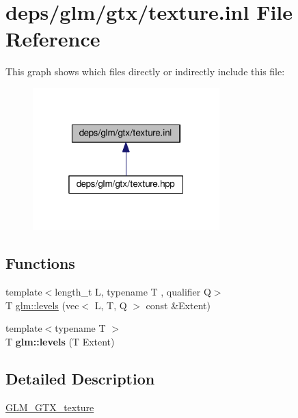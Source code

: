 \hypertarget{texture_8inl}{}\section{deps/glm/gtx/texture.inl File Reference}
\label{texture_8inl}
This graph shows which files directly or indirectly include this file\+:
\nopagebreak
\begin{figure}[H]
\begin{center}
\leavevmode
\includegraphics[width=205pt]{d5/da9/texture_8inl__dep__incl}
\end{center}
\end{figure}
\subsection*{Functions}
\begin{DoxyCompactItemize}
\item 
{\footnotesize template$<$length\+\_\+t L, typename T , qualifier Q$>$ }\\T \hyperlink{group__gtx__texture_gaa8c377f4e63486db4fa872d77880da73}{glm\+::levels} (vec$<$ L, T, Q $>$ const \&Extent)
\item 
\mbox{\label{texture_8inl_a13b06d94548039531a8d6af1a0c3e0c5}} 
{\footnotesize template$<$typename T $>$ }\\T {\bfseries glm\+::levels} (T Extent)
\end{DoxyCompactItemize}


\subsection{Detailed Description}
\hyperlink{group__gtx__texture}{G\+L\+M\+\_\+\+G\+T\+X\+\_\+texture} 